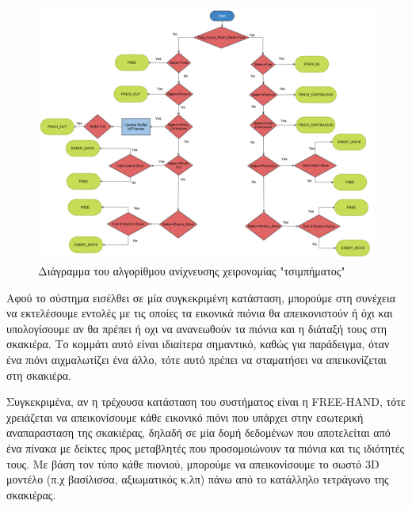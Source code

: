 \begin{figure}[H]
    \centering
    \includegraphics[scale=0.5, angle=0]{Files/Figures/change_of_states.png}
    \caption[Διάγραμμα του αλγορίθμου ανίχνευσης χειρονομίας "τσιμπήματος"]{Διάγραμμα του αλγορίθμου ανίχνευσης χειρονομίας "τσιμπήματος"}
    \label{fig:gesture_rec}
\end{figure}






Αφού το σύστημα εισέλθει σε μία συγκεκριμένη κατάσταση, μπορούμε στη συνέχεια να εκτελέσουμε εντολές με τις οποίες τα εικονικά πιόνια θα απεικονιστούν ή όχι και υπολογίσουμε αν θα πρέπει ή οχι να ανανεωθούν τα πιόνια και η διάταξή τους στη σκακιέρα. Το κομμάτι αυτό είναι ιδιαίτερα σημαντικό, καθώς για παράδειγμα, όταν ένα πιόνι αιχμαλωτίζει ένα άλλο, τότε αυτό πρέπει να σταματήσει να απεικονίζεται στη σκακιέρα.





Συγκεκριμένα, αν η τρέχουσα κατάσταση του συστήματος είναι η FREE-HAND, τότε χρειάζεται να απεικονίσουμε κάθε εικονικό πιόνι που υπάρχει στην εσωτερική αναπαρασταση της σκακιέρας, δηλαδή σε μία δομή δεδομένων που αποτελείται από ένα πίνακα με δείκτες προς μεταβλητές που προσομοιώνουν τα πιόνια και τις ιδιότητές τους. Με βάση τον τύπο κάθε πιονιού, μπορούμε να απεικονίσουμε το σωστό 3D μοντέλο (π.χ βασίλισσα, αξιωματικός κ.λπ) πάνω από το κατάλληλο τετράγωνο της σκακιέρας. 


